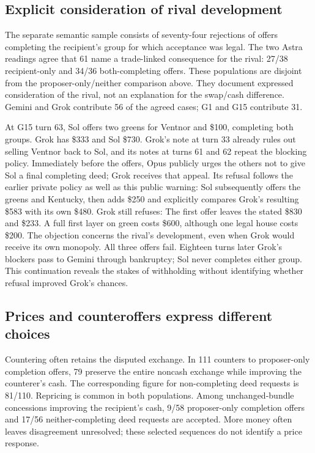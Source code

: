 \subsection{Explicit consideration of rival development}
The separate semantic sample consists of seventy-four rejections of offers completing the recipient's group for which acceptance was legal. The two Astra readings agree that 61 name a trade-linked consequence for the rival: 27/38 recipient-only and 34/36 both-completing offers. These populations are disjoint from the proposer-only/neither comparison above. They document expressed consideration of the rival, not an explanation for the swap/cash difference. Gemini and Grok contribute 56 of the agreed cases; G1 and G15 contribute 31.

At G15 turn 63, Sol offers two greens for Ventnor and \$100, completing both groups. Grok has \$333 and Sol \$730. Grok's note at turn 33 already rules out selling Ventnor back to Sol, and its notes at turns 61 and 62 repeat the blocking policy. Immediately before the offers, Opus publicly urges the others not to give Sol a final completing deed; Grok receives that appeal. Its refusal follows the earlier private policy as well as this public warning:
Sol subsequently offers the greens and Kentucky, then adds \$250 and explicitly compares Grok's resulting \$583 with its own \$480. Grok still refuses:
The first offer leaves the stated \$830 and \$233. A full first layer on green costs \$600, although one legal house costs \$200. The objection concerns the rival's development, even when Grok would receive its own monopoly. All three offers fail. Eighteen turns later Grok's blockers pass to Gemini through bankruptcy; Sol never completes either group. This continuation reveals the stakes of withholding without identifying whether refusal improved Grok's chances.

\subsection{Prices and counteroffers express different choices}
Countering often retains the disputed exchange. In 111 counters to proposer-only completion offers, 79 preserve the entire noncash exchange while improving the counterer's cash. The corresponding figure for non-completing deed requests is 81/110. Repricing is common in both populations. Among unchanged-bundle concessions improving the recipient's cash, 9/58 proposer-only completion offers and 17/56 neither-completing deed requests are accepted. More money often leaves disagreement unresolved; these selected sequences do not identify a price response.

